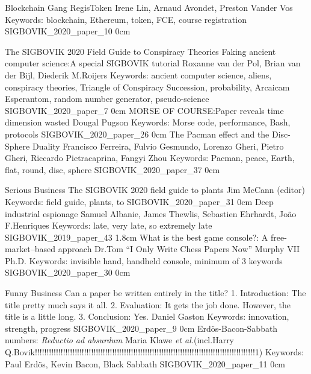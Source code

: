 \addtrack
	{}{Blockchain Gang}
\addpaper
	{RegisToken}
	{Irene Lin, Arnaud Avondet, Preston Vander Vos}
	{Keywords: blockchain, Ethereum, token, FCE, course registration}
	{SIGBOVIK_2020_paper_10}
	{0cm}
	{}

\addtrack
	{}{\textnormal{\normalsize The} SIGBOVIK 2020 Field Guide \textnormal{\normalsize to} Conspiracy Theories}
\addpaper
	{Faking ancient computer science:\@ A special SIGBOVIK tutorial}
	{Roxanne van der Pol, Brian van der Bijl, Diederik M.\@ Roijers}
	{Keywords: ancient computer science, aliens, conspiracy theories, Triangle of Conspiracy Succession, probability, Arcaicam Esperantom, random number generator, pseudo-science}
	{SIGBOVIK_2020_paper_7}
	{0cm}
	{}
\addpaper
	{MORSE OF COURSE:\@ Paper reveals time dimension wasted}
	{Dougal Pugson}
	{Keywords: Morse code, performance, Bash, protocols}
	{SIGBOVIK_2020_paper_26}
	{0cm}
	{}
\addpaper
	{The Pacman effect and the Disc-Sphere Duality}
	{Francisco Ferreira, Fulvio Gesmundo, Lorenzo Gheri, Pietro Gheri, Riccardo Pietracaprina, Fangyi Zhou}
	{Keywords: Pacman, peace, Earth, flat, round, disc, sphere}
	{SIGBOVIK_2020_paper_37}
	{0cm}
	{}

\addtrack
	{}{Serious Business}
\addpaper
	{The SIGBOVIK 2020 field guide to plants}
	{Jim McCann (editor)}
	{Keywords: field guide, plants, to}
	{SIGBOVIK_2020_paper_31}
	{0cm}
	{}
\addpaper
	{Deep industrial espionage}
	{Samuel Albanie, James Thewlis, Sebastien Ehrhardt, Jo\~ao F.\@ Henriques}
	{Keywords: late, very late, so extremely late}
	{SIGBOVIK_2019_paper_43}
	{1.8cm}
	{}
\addpaper
	{What is the best game console?: A free-market--based approach}
	{Dr.\@ Tom ``I Only Write Chess Papers Now'' Murphy VII Ph.D.}
	{Keywords: invisible hand, handheld console, minimum of 3 keywords}
	{SIGBOVIK_2020_paper_30}
	{0cm}
	{}

\addtrack
	{}{Funny Business}
\addpaper
	{Can a paper be written entirely in the title? 1. Introduction: The title pretty much says it all. 2. Evaluation: It gets the job done. However, the title is a little long. 3. Conclusion: Yes.}
	{Daniel Gaston}
	{Keywords: innovation, strength, progress}
	{SIGBOVIK_2020_paper_9}
	{0cm}
	{}
\addpaper
	{Erd\"os-Bacon-Sabbath numbers: \textit{Reductio ad absurdum}}
	{Maria Klawe \textit{et al.}\@ (incl.\@ Harry Q.\@ Bovik!!!!!!!!!!!!!!!!!!!!!!!!!!!!!!!!!!!!!!!!!!!!!!!!!!!!!!!!!!!!!!!!!!!!!!!!!!!!!!!!!!!!!!!!!!!!!!1)}
	{Keywords: Paul Erd\"os, Kevin Bacon, Black Sabbath}
	{SIGBOVIK_2020_paper_11}
	{0cm}
	{}
